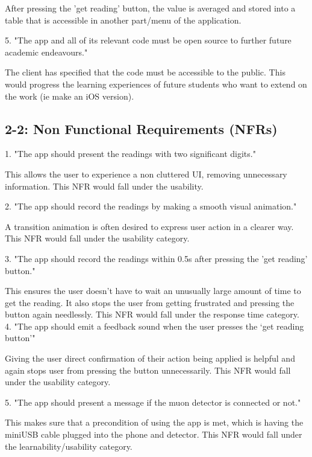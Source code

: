\documentclass[11pt,a4paper]{article}
\begin{document}
After pressing the 'get reading' button, the value is averaged and stored into a table that is accessible in another part/menu of the application.

\vskip 6mm
5. "The app and all of its relevant code must be open source to further future academic endeavours."

The client has specified that the code must be accessible to the public. This would progress the learning experiences of future students who want to extend on the work (ie make an iOS version).  


\subsection*{2-2: Non Functional Requirements (NFRs)}

1. "The app should present the readings with two significant digits."

This allows the user to experience a non cluttered UI, removing unnecessary information. This NFR would fall under the usability. 

\vskip 4mm

2. "The app should record the readings by making a smooth visual animation."

A transition animation is often desired to express user action in a clearer way. This NFR would fall under the usability category. 

\vskip 4mm

3. "The app should record the readings within 0.5s after pressing the 'get reading' button."

This ensures the user doesn't have to wait an unusually large amount of time to get the reading. It also stops the user from getting frustrated and pressing the button again needlessly. This NFR would fall under the response time category. 
\vskip 4mm
4. "The app should emit a feedback sound when the user presses the ‘get reading button’" 

Giving the user direct confirmation of their action being applied is helpful and again stops user from pressing the button unnecessarily. This NFR would fall under the usability category.

\vskip 4mm
5. "The app should present a message if the muon detector is connected or not."

This makes sure that a precondition of using the app is met, which is having the miniUSB cable plugged into the phone and detector. This NFR would fall under the learnability/usability category. 
\end{document}
